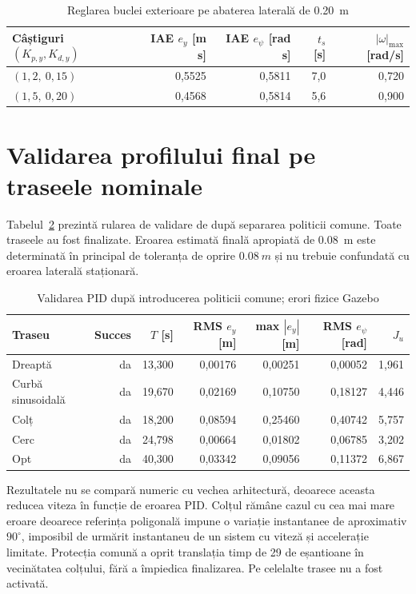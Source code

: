 \documentclass[12pt,a4paper,oneside]{report}
\begin{document}
\begin{table}[htbp]
  \centering
  \caption{Reglarea buclei exterioare pe abaterea laterală de \SI{0.20}{m}}
  \label{tab:outer-tuning}
  \begin{tabular}{lrrrr}
    \toprule
    Câștiguri $(K_{p,y},K_{d,y})$ & IAE $e_y$ [m s] & IAE $e_\psi$ [rad s]
      & $t_s$ [s] & $|\omega|_{\max}$ [rad/s] \\
    \midrule
    $(1{,}2,\ 0{,}15)$ & 0,5525 & 0,5811 & 7,0 & 0,720 \\
    $(1{,}5,\ 0{,}20)$ & 0,4568 & 0,5814 & 5,6 & 0,900 \\
    \bottomrule
  \end{tabular}
\end{table}

\section{Validarea profilului final pe traseele nominale}

Tabelul~\ref{tab:cascade-results} prezintă rularea de validare de după separarea
politicii comune. Toate traseele au fost finalizate. Eroarea estimată finală apropiată de
\SI{0.08}{m} este determinată în principal de toleranța de oprire
$\SI{0.08}{m}$ și nu trebuie confundată cu eroarea laterală staționară.

\begin{table}[htbp]
  \centering
  \small
  \caption{Validarea PID după introducerea politicii comune; erori fizice Gazebo}
  \label{tab:cascade-results}
  \begin{tabular}{lrrrrrr}
    \toprule
    Traseu & Succes & $T$ [s] & RMS $e_y$ [m] & max $|e_y|$ [m]
      & RMS $e_\psi$ [rad] & $J_u$ \\
    \midrule
    Dreaptă & da & 13,300 & 0,00176 & 0,00251 & 0,00052 & 1,961 \\
    Curbă sinusoidală & da & 19,670 & 0,02169 & 0,10750 & 0,18127 & 4,446 \\
    Colț & da & 18,200 & 0,08594 & 0,25460 & 0,40742 & 5,757 \\
    Cerc & da & 24,798 & 0,00664 & 0,01802 & 0,06785 & 3,202 \\
    Opt & da & 40,300 & 0,03342 & 0,09056 & 0,11372 & 6,867 \\
    \bottomrule
  \end{tabular}
\end{table}

Rezultatele nu se compară numeric cu vechea arhitectură, deoarece aceasta reducea
viteza în funcție de eroarea PID. Colțul rămâne cazul cu cea mai mare eroare deoarece
referința poligonală impune o variație instantanee de aproximativ $90^\circ$,
imposibil de urmărit instantaneu de un sistem cu viteză și accelerație limitate.
Protecția comună a oprit translația timp de 29 de eșantioane în vecinătatea
colțului, fără a împiedica finalizarea. Pe celelalte trasee nu a fost activată.
\end{document}
